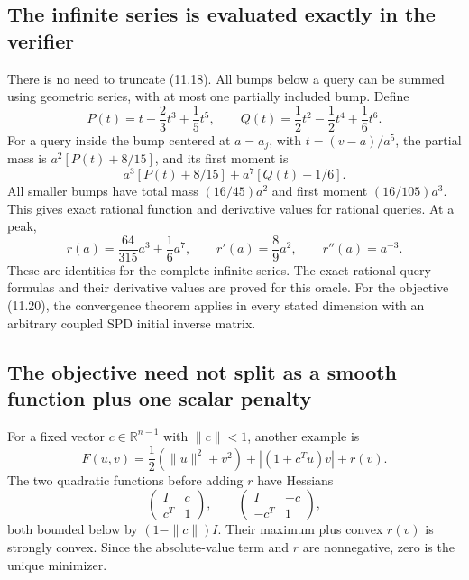 

\subsection{The infinite series is evaluated exactly in the
verifier}\label{U:the-infinite-series-is-evaluated-exactly-in-the-verifier}

There is no need to truncate (11.18). All bumps below a query can be summed
using geometric series, with at most one partially included bump. Define
\[
 P(t)=t-\frac23t^3+\frac15t^5,\qquad
 Q(t)=\frac12t^2-\frac12t^4+\frac16t^6.
\] For a query inside the bump centered at \(a=a_j\), with
\(t=(v-a)/a^5\), the partial mass is \(a^2[P(t)+8/15]\), and its first
moment is \[
 a^3[P(t)+8/15]+a^7[Q(t)-1/6].
\] All smaller bumps have total mass \((16/45)a^2\) and first moment
\((16/105)a^3\). This gives exact rational function and derivative
values for rational queries. At a peak, \[
 r(a)=\frac{64}{315}a^3+\frac16a^7,\qquad
 r'(a)=\frac89a^2,\qquad r''(a)=a^{-3}.
\] These are identities for the complete infinite series. The exact rational-query formulas and their derivative values are proved for this oracle. For the objective (11.20), the convergence theorem applies in every stated dimension with an arbitrary coupled SPD initial inverse matrix.



\subsection{The objective need not split as a smooth function plus
one scalar
penalty}\label{U:the-objective-need-not-split-as-a-smooth-function-plus-one-scalar-penalty}

For a fixed vector \(c\in\mathbb R^{n-1}\) with \(\|c\|<1\), another
example is \[
 F(u,v)=\frac12(\|u\|^2+v^2)+|(1+c^Tu)v|+r(v).
\] The two quadratic functions before adding \(r\) have Hessians \[
 \begin{pmatrix}I&c\\c^T&1\end{pmatrix},\qquad
 \begin{pmatrix}I&-c\\-c^T&1\end{pmatrix},
\] both bounded below by \((1-\|c\|)I\). Their maximum plus convex
\(r(v)\) is strongly convex. Since the absolute-value term and \(r\) are
nonnegative, zero is the unique minimizer.

